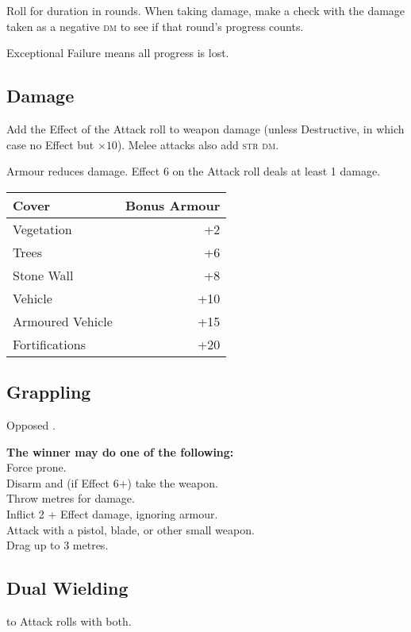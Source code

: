 \documentclass{cheatsheet}
\begin{document}
\begin{multicols}{3}
Roll for duration in rounds.  When taking damage, make a check with
the damage taken as a negative \textsc{dm} to see if that round's
progress counts.

Exceptional Failure means all progress is lost.

\subsection{Damage}

Add the Effect of the Attack roll to weapon damage (unless
Destructive, in which case no Effect but $\times 10$).  Melee attacks
also add \textsc{str} \textsc{dm}.

Armour reduces damage.  Effect 6 on the Attack roll deals at least 1
damage.

\begin{tabularx}{\linewidth}{Xr} \toprule
Cover & Bonus Armour \\ \midrule
Vegetation & +2 \\
Trees & +6 \\
Stone Wall & +8 \\
Vehicle & +10 \\
Armoured Vehicle & +15 \\
Fortifications & +20 \\ \bottomrule
\end{tabularx}

\subsection{Grappling}

Opposed .

\textbf{The winner may do one of the following:}\\
Force prone.\\
Disarm and (if Effect 6+) take the weapon.\\
Throw  metres for  damage.\\
Inflict 2 + Effect damage, ignoring armour.\\
Attack with a pistol, blade, or other small weapon.\\
Drag up to 3 metres.

\subsection{Dual Wielding}

 to Attack rolls with both.


\end{multicols}
\end{document}
